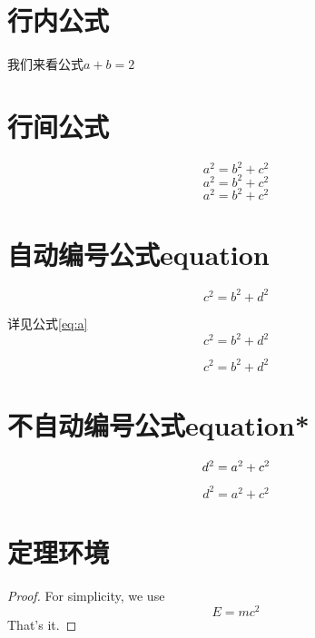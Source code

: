 \documentclass{article}
\begin{document}
\section{行内公式} %
    我们来看公式$a+b=2$ %

    \section{行间公式}
    \[a^2 = b ^2 + c^2 \tag{*}\] %
    $$a^2 = b ^2 + c^2 $$
    \begin{displaymath}
    a^2 = b ^2 + c^2
    \end{displaymath}

    \section{自动编号公式equation}
    \begin{equation} %
    c^2 = b ^2 + d^2 
    \end{equation}

    详见公式\ref{eq:a}
    \begin{equation} 
    c^2 = b ^2 + d^2 \label{eq:a}
    \end{equation}

    \begin{equation} 
    c^2 = b ^2 + d^2 \tag{*} 
    \end{equation}

    \section{不自动编号公式equation*}  
    \begin{equation}
    d^2 = a ^2 + c^2 \notag
    \end{equation}
    
    \begin{equation*}
    d^2 = a ^2 + c^2 
    \end{equation*}

    \section{定理环境}
    \begin{proof}
    For simplicity, we use
    \[
    E=mc^2
    \]
    That's it.
    \end{proof}
\end{document}
